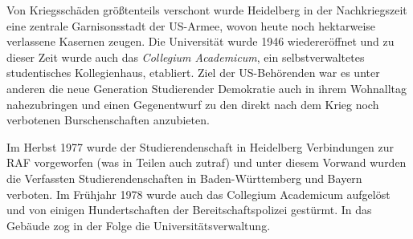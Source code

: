 Von Kriegsschäden größtenteils verschont wurde Heidelberg in der Nachkriegszeit eine zentrale Garnisonsstadt der US-Armee, wovon heute noch hektarweise verlassene Kasernen zeugen. Die Universität wurde 1946 wiedereröffnet und zu dieser Zeit wurde auch das \textit{Collegium Academicum}, ein selbstverwaltetes studentisches Kollegienhaus, etabliert. Ziel der US-Behörenden war es unter anderen die neue Generation Studierender Demokratie auch in ihrem Wohnalltag nahezubringen und einen Gegenentwurf zu den direkt nach dem Krieg noch verbotenen Burschenschaften anzubieten.

Im Herbst 1977 wurde der Studierendenschaft in Heidelberg Verbindungen zur RAF vorgeworfen (was in Teilen auch zutraf) und unter diesem Vorwand wurden die Verfassten Studierendenschaften in Baden-Württemberg und Bayern verboten. Im Frühjahr 1978 wurde auch das Collegium Academicum aufgelöst und von einigen Hundertschaften der Bereitschaftspolizei gestürmt. In das Gebäude zog in der Folge die Universitätsverwaltung.
